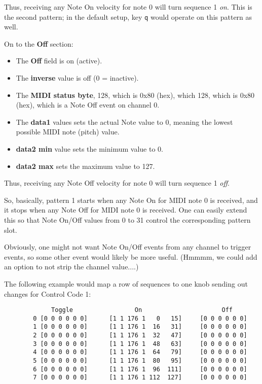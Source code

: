    Thus, receiving any Note On velocity for note 0 will turn sequence
   1 \textsl{on}.  This is the second pattern; in the default setup, key
   \texttt{q} would operate on this pattern as well.
   
   On to the \textbf{Off} section:

   \begin{itemize}
      \item The \textbf{Off} field is on (active).
      \item The \textbf{inverse} value is off (0 = inactive).
      \item The \textbf{MIDI status byte}, 128, which is 0x80 (hex), which
         128, which is 0x80 (hex), which is a Note Off event on channel 0.
      \item The \textbf{data1} values sets the actual Note value to 0,
         meaning the lowest possible MIDI note (pitch) value.
      \item \textbf{data2 min} value sets the minimum value to 0.
      \item \textbf{data2 max} sets the maximum value to 127.
   \end{itemize}

   Thus, receiving any Note Off velocity for note 0 will turn sequence
   1 \textsl{off}.

   So, basically, pattern 1 starts when any Note On for MIDI note 0
   is received, and it stops when any Note Off for MIDI note 0 is received.  
   One can easily extend this so that Note On/Off values from 0 to 31
   control the corresponding pattern slot.

   Obviously, one might not want Note On/Off events from any channel to trigger
   events, so some other event would likely be more useful.
   (Hmmmm, we could add an option to not strip the channel value....)

   The following example would map a row of sequences to one knob sending
   out changes for Control Code 1:

   \begin{verbatim}
             Toggle                 On                      Off
        0 [0 0 0 0 0 0]      [1 1 176 1   0   15]     [0 0 0 0 0 0]
        1 [0 0 0 0 0 0]      [1 1 176 1  16   31]     [0 0 0 0 0 0]
        2 [0 0 0 0 0 0]      [1 1 176 1  32   47]     [0 0 0 0 0 0]
        3 [0 0 0 0 0 0]      [1 1 176 1  48   63]     [0 0 0 0 0 0]
        4 [0 0 0 0 0 0]      [1 1 176 1  64   79]     [0 0 0 0 0 0]
        5 [0 0 0 0 0 0]      [1 1 176 1  80   95]     [0 0 0 0 0 0]
        6 [0 0 0 0 0 0]      [1 1 176 1  96  111]     [0 0 0 0 0 0]
        7 [0 0 0 0 0 0]      [1 1 176 1 112  127]     [0 0 0 0 0 0]
   \end{verbatim}

